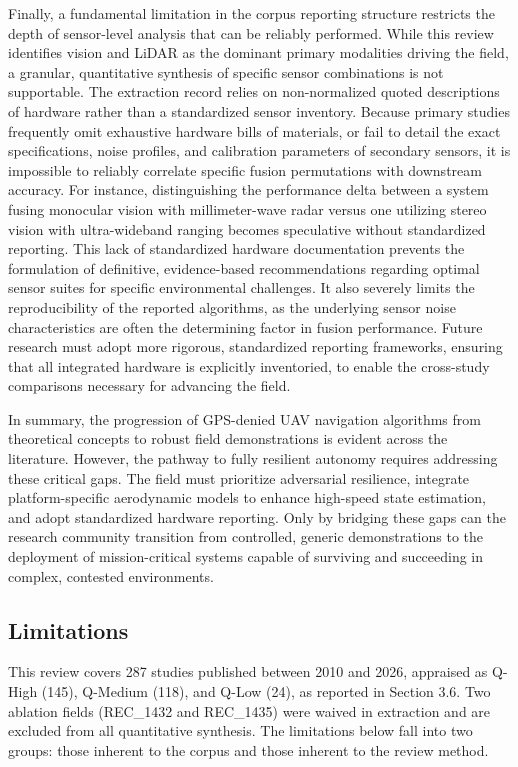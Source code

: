 \documentclass[conference]{IEEEtran}
\begin{document}
Finally, a fundamental limitation in the corpus reporting structure restricts the depth of sensor-level analysis that can be reliably performed. While this review identifies vision and LiDAR as the dominant primary modalities driving the field, a granular, quantitative synthesis of specific sensor combinations is not supportable. The extraction record relies on non-normalized quoted descriptions of hardware rather than a standardized sensor inventory. Because primary studies frequently omit exhaustive hardware bills of materials, or fail to detail the exact specifications, noise profiles, and calibration parameters of secondary sensors, it is impossible to reliably correlate specific fusion permutations with downstream accuracy. For instance, distinguishing the performance delta between a system fusing monocular vision with millimeter-wave radar versus one utilizing stereo vision with ultra-wideband ranging becomes speculative without standardized reporting. This lack of standardized hardware documentation prevents the formulation of definitive, evidence-based recommendations regarding optimal sensor suites for specific environmental challenges. It also severely limits the reproducibility of the reported algorithms, as the underlying sensor noise characteristics are often the determining factor in fusion performance. Future research must adopt more rigorous, standardized reporting frameworks, ensuring that all integrated hardware is explicitly inventoried, to enable the cross-study comparisons necessary for advancing the field.


In summary, the progression of GPS-denied UAV navigation algorithms from theoretical concepts to robust field demonstrations is evident across the literature. However, the pathway to fully resilient autonomy requires addressing these critical gaps. The field must prioritize adversarial resilience, integrate platform-specific aerodynamic models to enhance high-speed state estimation, and adopt standardized hardware reporting. Only by bridging these gaps can the research community transition from controlled, generic demonstrations to the deployment of mission-critical systems capable of surviving and succeeding in complex, contested environments.


\subsection{Limitations}


This review covers 287 studies published between 2010 and 2026, appraised as Q-High (145), Q-Medium (118), and Q-Low (24), as reported in Section 3.6. Two ablation fields (REC\_1432 and REC\_1435) were waived in extraction and are excluded from all quantitative synthesis. The limitations below fall into two groups: those inherent to the corpus and those inherent to the review method.
\end{document}
